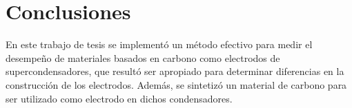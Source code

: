 \chapter{Conclusiones}
En este trabajo de tesis se implementó un método efectivo para medir el desempeño de materiales basados en carbono como electrodos de supercondensadores, que resultó ser apropiado para determinar diferencias en la construcción de los electrodos. Además, se sintetizó un material de carbono para ser utilizado como electrodo en dichos condensadores.